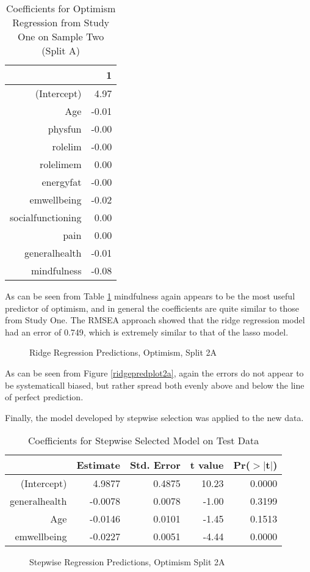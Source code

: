 \documentclass{article}
\begin{document}
\begin{table}[ht]
\centering
\begin{tabular}{rr}
  \hline
 & 1 \\ 
  \hline
(Intercept) & 4.97 \\ 
  Age & -0.01 \\ 
  physfun & -0.00 \\ 
  rolelim & -0.00 \\ 
  rolelimem & 0.00 \\ 
  energyfat & -0.00 \\ 
  emwellbeing & -0.02 \\ 
  socialfunctioning & 0.00 \\ 
  pain & 0.00 \\ 
  generalhealth & -0.01 \\ 
  mindfulness & -0.08 \\ 
   \hline
\end{tabular}
\caption{Coefficients for Optimism Regression from Study One on Sample Two (Split A)} 
\label{tab:homoptridge2a}
\end{table}
As can be seen from Table \ref{tab:homoptridge2a} mindfulness again appears to be the most useful predictor of optimism, and in general the coefficients are quite similar to those from Study One. The RMSEA approach showed that the ridge regression model had an error of 0.749, which is extremely similar to that of the lasso model. 
\begin{figure}
  \caption{Ridge Regression Predictions, Optimism, Split 2A}
  \label{fig:ridgepredplot2a}
\end{figure}


As can be seen from Figure \ref{ridgepredplot2a}, again the errors do not appear to be systematicall biased, but rather spread both evenly above and below the line of perfect prediction. 

Finally, the model developed by stepwise selection was applied to the new data. 

\begin{table}[ht]
\centering
\begin{tabular}{rrrrr}
  \hline
 & Estimate & Std. Error & t value & Pr($>$$|$t$|$) \\ 
  \hline
(Intercept) & 4.9877 & 0.4875 & 10.23 & 0.0000 \\ 
  generalhealth & -0.0078 & 0.0078 & -1.00 & 0.3199 \\ 
  Age & -0.0146 & 0.0101 & -1.45 & 0.1513 \\ 
  emwellbeing & -0.0227 & 0.0051 & -4.44 & 0.0000 \\ 
   \hline
\end{tabular}
\caption{Coefficients for Stepwise Selected Model on Test Data} 
\label{tab:homstepopttest2a}
\end{table}
\begin{figure}
  \caption{Stepwise Regression Predictions, Optimism Split 2A}
  \label{fig:optstepredplot}
\end{figure}
\end{document}
